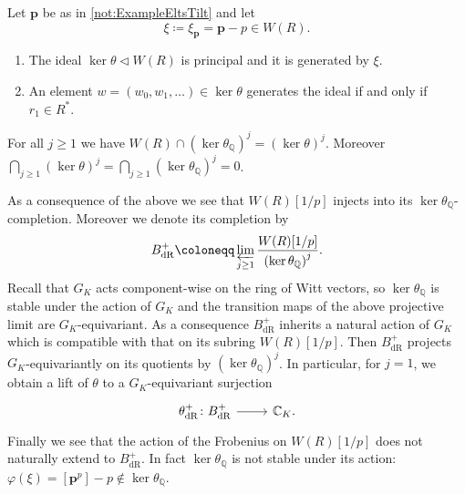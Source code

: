 \begin{prop}
	Let $\mathbf{p}$ be as in \cref{not:ExampleEltsTilt} and let
	\begin{equation*}
	\xi \coloneqq \xi_{\mathbf{p}} = \mathbf{p} - p \in W(R)
	.\end{equation*}
\begin{enumerate}
	\item The ideal $\ker \theta \triangleleft W(R)$ is principal and it is generated
		by $\xi$.
	\item An element $w = (w_0, w_1, \ldots) \in \ker\theta$ generates
		the ideal if and only if $r_1 \in R^*$.
\end{enumerate}
\end{prop}


\begin{cor}
	For all $j \geq 1$ we have $W(R) \cap \left( \ker \theta_{\mathbb{Q}} \right)^j =
	\left( \ker \theta \right)^j$.
	Moreover $\bigcap_{j \geq 1} \left( \ker \theta \right)^j =
	\bigcap_{j \geq 1} \left( \ker \theta_{\mathbb{Q}} \right)^j = 0$.
\end{cor} 


\begin{rem}[]
	As a consequence of the above we see that $W(R)[1/p]$
	injects into its $\ker \theta_{\mathbb{Q}}$-completion.
	Moreover we denote its completion by
	\begin{equation*}
	B^+_{\mathrm{dR}} \coloneqq \varprojlim_{j \geq 1}
	\frac{ W(R)[1/p] }{ \left( \ker \theta_{\mathbb{Q}} \right)^j }
	.\end{equation*}
	Recall that $G_K$ acts component-wise on the ring of Witt vectors,
	so $\ker \theta_{\mathbb{Q}}$ is stable under the action of $G_K$
	and the transition maps of the above projective limit are $G_K$-equivariant.
	As a consequence $B^+_{\mathrm{dR}}$ inherits a natural action of $G_K$
	which is compatible with that on its subring $W(R)[1/p]$.
	Then $B^+_{\mathrm{dR}}$ projects $G_K$-equivariantly on its quotients
	by $\left( \ker \theta_{\mathbb{Q}} \right)^j$.
	In particular, for $j = 1$, we obtain a lift of $\theta$ 
	to a $G_K$-equivariant surjection
	\begin{equation*}
	\begin{tikzcd}[row sep = 0ex
		,/tikz/column 1/.append style={anchor=base east}
		,/tikz/column 2/.append style={anchor=base west}]
		\theta^+_{\mathrm{dR}}\colon B^+_{\mathrm{dR}} \arrow[r, "", rightarrow] &
		\mathbb{C}_K
	.\end{tikzcd}
	\end{equation*} 
	Finally we see that the action of the Frobenius on $W(R)[1/p]$
	does not naturally extend to $B^+_{\mathrm{dR}}$.
	In fact $\ker \theta_{\mathbb{Q}}$ is not stable under its action:
	$\varphi(\xi) = [\mathbf{p}^p] - p \notin \ker \theta_{\mathbb{Q}}$.
\end{rem}


